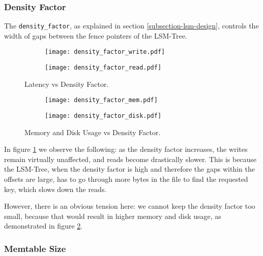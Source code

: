 \subsubsection{Density Factor}
The \verb"density_factor", as explained in section \ref{subsection-lsm-design}, controls the width of gaps between the fence pointers of the LSM-Tree.

\begin{figure}[h]
    \begin{subfigure}{.5\textwidth}
        \centering
        \texttt{[image: density\_factor\_write.pdf]}
    \end{subfigure}
    \begin{subfigure}{.5\textwidth}
        \centering
        \texttt{[image: density\_factor\_read.pdf]}
    \end{subfigure}
    \caption{Latency vs Density Factor.}
    \label{fig:density_factor_write_read}
\end{figure}

\begin{figure}[h]
    \begin{subfigure}{.5\textwidth}
        \centering
        \texttt{[image: density\_factor\_mem.pdf]}
    \end{subfigure}
    \begin{subfigure}{.5\textwidth}
        \centering
        \texttt{[image: density\_factor\_disk.pdf]}
    \end{subfigure}
    \caption{Memory and Disk Usage vs Density Factor.}
    \label{fig:density_factor_mem_disk}
\end{figure}

In figure \ref{fig:density_factor_write_read} we observe the following: as the density factor increases, the writes remain virtually unaffected, and reads become drastically slower. This is because the LSM-Tree, when the density factor is high and therefore the gaps within the offsets are large, has to go through more bytes in the file to find the requested key, which slows down the reads.

However, there is an obvious tension here: we cannot keep the density factor too small, because that would result in higher memory and disk usage, as demonstrated in figure \ref{fig:density_factor_mem_disk}.

\subsubsection{Memtable Size}

